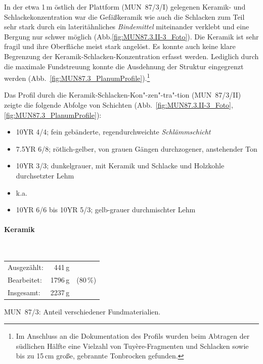 In der etwa 1\,m östlich der Plattform (MUN~87/3/I) gelegenen Keramik- und Schlackekonzentration war die Gefäßkeramik wie auch die Schlacken zum Teil sehr stark durch ein lateritähnliches \textit{Bindemittel} miteinander verklebt und eine Bergung nur schwer möglich (Abb.\ref{fig:MUN87.3.II-3_Foto}). Die Keramik ist sehr fragil und ihre Oberfläche meist stark angelöst. Es konnte auch keine klare Begrenzung der Keramik-Schlacken-Konzentration erfasst werden. Lediglich durch die maximale Fundstreuung konnte die Ausdehnung der Struktur eingegrenzt werden (Abb.~\ref{fig:MUN87.3_PlanumProfile}).\footnote{Im Anschluss an die Dokumentation des Profils wurden beim Abtragen der südlichen Hälfte eine Vielzahl von Tuyère-Fragmenten und Schlacken sowie bis zu 15\,cm große, gebrannte Tonbrocken gefunden.}

\vspace{1.5em}
\noindent Das Profil durch die Keramik-Schlacken-Kon"-zen"-tra"-tion (MUN~87/3/II) zeigte die folgende Abfolge von Schichten (Abb.~\ref{fig:MUN87.3.II-3_Foto}, \ref{fig:MUN87.3_PlanumProfile}):
\begin{itemize}[leftmargin=*, labelindent=1em, noitemsep, topsep=0pt]
\item [(1)] 10YR 4/4; fein gebänderte, regendurchweichte \textit{Schlämmschicht}
\item [(2)] 7.5YR 6/8; rötlich-gelber, von grauen Gängen durchzogener, anstehender Ton
\item [(3)] 10YR 3/3; dunkelgrauer, mit Keramik und Schlacke und Holzkohle durchsetzter Lehm
\item [(4)] k.a.
\item [(5)] 10YR 6/6 bis 10YR 5/3; gelb-grauer durchmischter Lehm
\end{itemize}

\paragraph{Keramik\vspace{.5em}}\mbox{}\\
\begin{tabular}{@{}lrl@{}}
Ausgezählt: & 441\,g & \\ 
Bearbeitet: & 1796\,g & (80\,\%) \\ 
Insgesamt: & 2237\,g & \\ 
\end{tabular} 

\begin{table}[p]
\centering
{\footnotesize}
\caption{MUN~87/3: Anteil verschiedener Fundmaterialien.}
\label{tab:MUN87-3_Funde}
\end{table}

